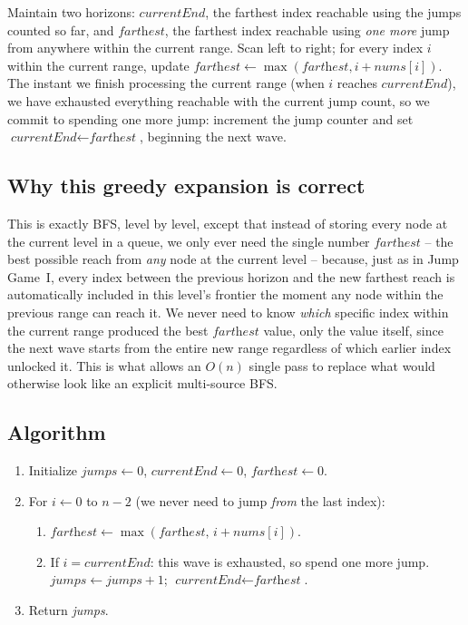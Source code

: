 \begin{ideabox}
Maintain two horizons: $\textit{currentEnd}$, the farthest index reachable
using the jumps counted so far, and $\textit{farthest}$, the farthest index
reachable using \emph{one more} jump from anywhere within the current
range. Scan left to right; for every index $i$ within the current range,
update $\textit{farthest} \gets \max(\textit{farthest}, i +
\textit{nums}[i])$. The instant we finish processing the current range (when
$i$ reaches $\textit{currentEnd}$), we have exhausted everything reachable
with the current jump count, so we commit to spending one more jump:
increment the jump counter and set $\textit{currentEnd} \gets
\textit{farthest}$, beginning the next wave.
\end{ideabox}

\subsection*{Why this greedy expansion is correct}

This is exactly BFS, level by level, except that instead of storing every
node at the current level in a queue, we only ever need the single number
$\textit{farthest}$ -- the best possible reach from \emph{any} node at the
current level -- because, just as in Jump Game~I, every index between the
previous horizon and the new farthest reach is automatically included in
this level's frontier the moment any node within the previous range can
reach it. We never need to know \emph{which} specific index within the
current range produced the best $\textit{farthest}$ value, only the value
itself, since the next wave starts from the entire new range regardless of
which earlier index unlocked it. This is what allows an $O(n)$ single pass
to replace what would otherwise look like an explicit multi-source BFS.

\subsection*{Algorithm}

\begin{enumerate}
  \item Initialize $\textit{jumps} \gets 0$, $\textit{currentEnd} \gets 0$,
        $\textit{farthest} \gets 0$.
  \item For $i \gets 0$ to $n-2$ (we never need to jump \emph{from} the last
        index):
  \begin{enumerate}
    \item $\textit{farthest} \gets \max(\textit{farthest},\, i +
          \textit{nums}[i])$.
    \item If $i = \textit{currentEnd}$: this wave is exhausted, so spend one
          more jump. $\textit{jumps} \gets \textit{jumps} + 1$;
          $\textit{currentEnd} \gets \textit{farthest}$.
  \end{enumerate}
  \item Return \textit{jumps}.
\end{enumerate}


